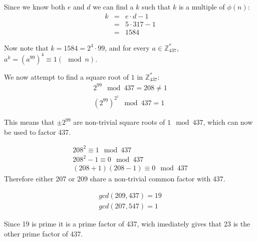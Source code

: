 Since we know both $e$ and $d$ we can find a $k$ such that $k$ is a multiple of $\phi(n)$:
\begin{eqnarray*}
    k &=& e \cdot d -1 \\
    &=& 5 \cdot 317 -1 \\
    &=& 1584
\end{eqnarray*}

Now note that $k = 1584 = 2^{4} \cdot 99$, and for every $a \in \mathbb{Z}^{*}_{437}$, $a^{k} = (a^{99})^{4} \equiv 1 (\mod n)$.

We now attempt to find a square root of $1$ in $\mathbb{Z}^{*}_{437}$:
\begin{eqnarray*}
    2^{99} \mod 437 = 208 \neq 1 \\
    (2^{99})^{2^{1}} \mod 437 = 1
\end{eqnarray*}

This means that $\pm 2^{99}$ are non-trivial square roots of $1 \mod 437$, which can now be used to factor 437.

\begin{eqnarray*}
    208^{2} \equiv 1 \mod 437 \\
    208^{2} - 1 \equiv 0 \mod 437 \\
    (208 + 1)(208 - 1) \equiv 0 \mod 437
\end{eqnarray*}
Therefore either 207 or 209 share a non-trivial common factor with 437.

\begin{eqnarray*}
    gcd(209,437) = 19 \\
    gcd(207,547) = 1
\end{eqnarray*}

Since 19 is prime it is a prime factor of 437, wich imediately gives that 23 is the other prime factor of 437.